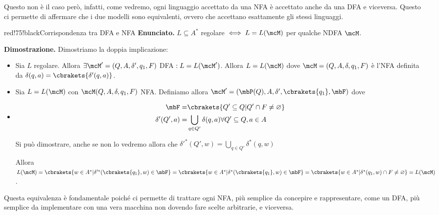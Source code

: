 Questo non è il caso però, infatti, come vedremo, ogni linguaggio accettato da una NFA è accettato anche da una DFA e viceversa. Questo ci permette di affermare che i due modelli sono equivalenti, ovvero che accettano esattamente gli stessi linguaggi.

\begin{halfframedbox}{red!75!black}{Corrispondenza tra DFA e NFA}\label{Corrispondenza tra DFA e NFA}
  \textbf{Enunciato. } \(L\subseteq A^*\) regolare \(\iff L=L(\mcM)\) per qualche NDFA \(\mcM\).

  \begin{center}
    \textcolor{red!75!black}{\hdashrule[0.5ex]{18cm}{1pt}{3mm 3pt 1mm 2pt}}
  \end{center}

  \textbf{Dimostrazione. } Dimostriamo la doppia implicazione:
  \begin{itemize}
    \item[``\(\Rightarrow\)''] Sia \(L\) regolare. Allora \(\exists \mcM'=(Q,A,\delta',q_1,F)\) DFA \(: L=L(\mcM')\). Allora \(L=L(\mcM)\) dove \(\mcM=(Q,A,\delta,q_1,F)\) è l'NFA definita da \(\delta(q,a)=\cbrakets{\delta'(q,a)}\).
    \item[``\(\Leftarrow\)''] Sia \(L=L(\mcM)\) con \(\mcM(Q,A,\delta,q_1,F)\) NFA. Definiamo allora \(\mcM'=(\mbP(Q), A, \delta', \cbrakets{q_1}, \mbF)\) dove %
    \item[]
    \begin{equation}
      \begin{split}
        \mbF = &\cbrakets{Q' \subseteq Q \vert Q' \cap F \neq \varnothing }\\
        \delta'(Q',a)=&\bigcup\limits_{q \in Q'} \delta(q,a) \forall Q'\subseteq Q, a \in A
      \end{split}
    \end{equation}

    Si può dimostrare, anche se non lo vedremo allora che \(\delta'^*(Q',w)=\bigcup\limits_{q \in Q'}\delta^*(q,w)\)

    Allora \(L(\mcM)=\cbrakets{w \in A^* \vert \delta'^*(\cbrakets{q_1},w) \in \mbF} = \cbrakets{w \in A^* \vert \delta^*(\cbrakets{q_1},w) \in \mbF} = \cbrakets{w \in A^* \vert \delta^*(q_1,w) \cap F \neq \varnothing}=L(\mcM)\).

  \end{itemize}
\end{halfframedbox}

Questa equivalenza è fondamentale poiché ci permette di trattare ogni NFA, più semplice da concepire e rappresentare, come un DFA, più semplice da implementare con una vera macchina non dovendo fare scelte arbitrarie, e viceversa.
